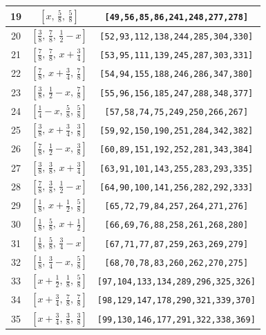 \documentclass[fleqn,8pt]{jsarticle}
\begin{document}
\begin{longtable}{ccc}
19 & $\left[ x,\, \frac{5}{8},\, \frac{5}{8} \right]$ & {\tt [49,56,85,86,241,248,277,278]} \\ \hline
20 & $\left[ \frac{3}{8},\, \frac{7}{8},\, \frac{1}{2} - x \right]$ & {\tt [52,93,112,138,244,285,304,330]} \\ \hline
21 & $\left[ \frac{7}{8},\, \frac{7}{8},\, x + \frac{3}{4} \right]$ & {\tt [53,95,111,139,245,287,303,331]} \\ \hline
22 & $\left[ \frac{7}{8},\, x + \frac{3}{4},\, \frac{7}{8} \right]$ & {\tt [54,94,155,188,246,286,347,380]} \\ \hline
23 & $\left[ \frac{3}{8},\, \frac{1}{2} - x,\, \frac{7}{8} \right]$ & {\tt [55,96,156,185,247,288,348,377]} \\ \hline
24 & $\left[ \frac{1}{4} - x,\, \frac{5}{8},\, \frac{5}{8} \right]$ & {\tt [57,58,74,75,249,250,266,267]} \\ \hline
25 & $\left[ \frac{3}{8},\, x + \frac{3}{4},\, \frac{3}{8} \right]$ & {\tt [59,92,150,190,251,284,342,382]} \\ \hline
26 & $\left[ \frac{7}{8},\, \frac{1}{2} - x,\, \frac{3}{8} \right]$ & {\tt [60,89,151,192,252,281,343,384]} \\ \hline
27 & $\left[ \frac{3}{8},\, \frac{3}{8},\, x + \frac{3}{4} \right]$ & {\tt [63,91,101,143,255,283,293,335]} \\ \hline
28 & $\left[ \frac{7}{8},\, \frac{3}{8},\, \frac{1}{2} - x \right]$ & {\tt [64,90,100,141,256,282,292,333]} \\ \hline
29 & $\left[ \frac{1}{8},\, x + \frac{1}{2},\, \frac{5}{8} \right]$ & {\tt [65,72,79,84,257,264,271,276]} \\ \hline
30 & $\left[ \frac{1}{8},\, \frac{5}{8},\, x + \frac{1}{2} \right]$ & {\tt [66,69,76,88,258,261,268,280]} \\ \hline
31 & $\left[ \frac{1}{8},\, \frac{5}{8},\, \frac{3}{4} - x \right]$ & {\tt [67,71,77,87,259,263,269,279]} \\ \hline
32 & $\left[ \frac{1}{8},\, \frac{3}{4} - x,\, \frac{5}{8} \right]$ & {\tt [68,70,78,83,260,262,270,275]} \\ \hline
33 & $\left[ x + \frac{1}{2},\, \frac{1}{8},\, \frac{5}{8} \right]$ & {\tt [97,104,133,134,289,296,325,326]} \\ \hline
34 & $\left[ x + \frac{3}{4},\, \frac{7}{8},\, \frac{7}{8} \right]$ & {\tt [98,129,147,178,290,321,339,370]} \\ \hline
35 & $\left[ x + \frac{3}{4},\, \frac{3}{8},\, \frac{3}{8} \right]$ & {\tt [99,130,146,177,291,322,338,369]} \\ \hline

\end{longtable}
\end{document}
